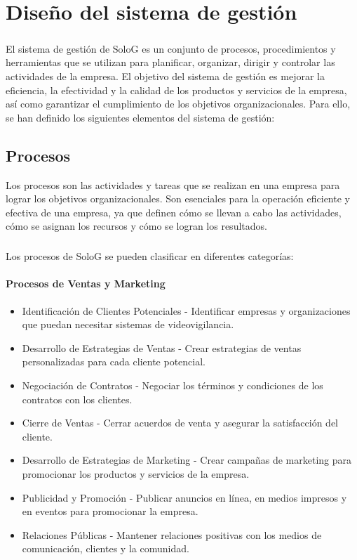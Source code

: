 \documentclass{report}
\begin{document}
    \chapter{Diseño del sistema de gestión}
      \paragraph*{}
      {
        El sistema de gestión de SoloG es un conjunto de procesos, procedimientos y herramientas que se utilizan para planificar, organizar, dirigir y controlar las actividades de la empresa. 
        El objetivo del sistema de gestión es mejorar la eficiencia, la efectividad y la calidad de los productos y servicios de la empresa, así como garantizar el cumplimiento de los objetivos organizacionales.
        Para ello, se han definido los siguientes elementos del sistema de gestión:
      }
      \section{Procesos}
        {
          Los procesos son las actividades y tareas que se realizan en una empresa para lograr los objetivos organizacionales. 
          Son esenciales para la operación eficiente y efectiva de una empresa, ya que definen cómo se llevan a cabo las actividades, cómo se asignan los recursos y cómo se logran los resultados.
        }
        \paragraph*{}
        {
          Los procesos de SoloG se pueden clasificar en diferentes categorías:
        }
        \subsubsection*{Procesos de Ventas y Marketing}
          \begin{itemize}
            \item Identificación de Clientes Potenciales - Identificar empresas y organizaciones que puedan necesitar sistemas de videovigilancia.
            \item Desarrollo de Estrategias de Ventas - Crear estrategias de ventas personalizadas para cada cliente potencial.
            \item Negociación de Contratos - Negociar los términos y condiciones de los contratos con los clientes.
            \item Cierre de Ventas - Cerrar acuerdos de venta y asegurar la satisfacción del cliente.
            \item Desarrollo de Estrategias de Marketing - Crear campañas de marketing para promocionar los productos y servicios de la empresa.
            \item Publicidad y Promoción - Publicar anuncios en línea, en medios impresos y en eventos para promocionar la empresa.
            \item Relaciones Públicas - Mantener relaciones positivas con los medios de comunicación, clientes y la comunidad.
          \end{itemize}
\end{document}

